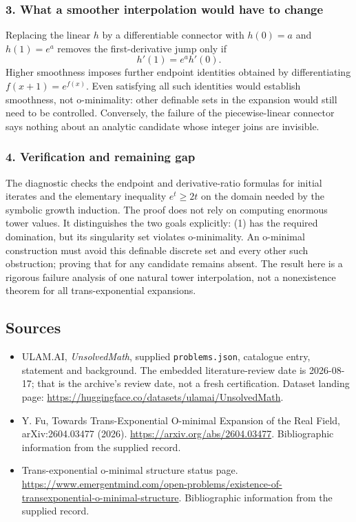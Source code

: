 \documentclass[11pt,a4paper]{article}
\begin{document}
\subsubsection{3. What a smoother interpolation would have to change}
Replacing the linear $h$ by a differentiable connector with $h(0)=a$ and $h(1)=e^a$ removes the first-derivative jump only if
\[h'(1)=e^a h'(0).
\]
Higher smoothness imposes further endpoint identities obtained by differentiating $f(x+1)=e^{f(x)}$. Even satisfying all such identities would establish smoothness, not o-minimality: other definable sets in the expansion would still need to be controlled. Conversely, the failure of the piecewise-linear connector says nothing about an analytic candidate whose integer joins are invisible.

\subsubsection{4. Verification and remaining gap}
The diagnostic checks the endpoint and derivative-ratio formulas for initial iterates and the elementary inequality $e^t\geq2t$ on the domain needed by the symbolic growth induction. The proof does not rely on computing enormous tower values. It distinguishes the two goals explicitly: (1) has the required domination, but its singularity set violates o-minimality. An o-minimal construction must avoid this definable discrete set and every other such obstruction; proving that for any candidate remains absent. The result here is a rigorous failure analysis of one natural tower interpolation, not a nonexistence theorem for all trans-exponential expansions.

\subsection{Sources}

{\small

\begin{itemize}

\item[\hypertarget{source:statement:1}{S1}] ULAM.AI, \emph{UnsolvedMath}, supplied \texttt{problems.json}, catalogue entry, statement and background. The embedded literature-review date is 2026-08-17; that is the archive’s review date, not a fresh certification. Dataset landing page: \url{https://huggingface.co/datasets/ulamai/UnsolvedMath}.

\item[\hypertarget{source:statement:2}{S2}] Y. Fu, Towards Trans-Exponential O-minimal Expansion of the Real Field, arXiv:2604.03477 (2026). \url{https://arxiv.org/abs/2604.03477}. Bibliographic information from the supplied record.

\item[\hypertarget{source:statement:3}{S3}] Trans-exponential o-minimal structure status page. \url{https://www.emergentmind.com/open-problems/existence-of-transexponential-o-minimal-structure}. Bibliographic information from the supplied record.

\end{itemize}

}

\label{end:statement}
\end{document}

